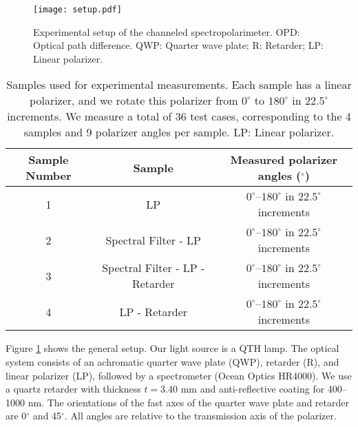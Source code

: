 \documentclass[10pt]{article}
\numberwithin{equation}{subsection}
\begin{document}
\begin{figure}[!htb]
    \centering
    \texttt{[image: setup.pdf]}
    \caption{Experimental setup of the channeled spectropolarimeter. OPD: Optical path difference. QWP: Quarter wave plate; R: Retarder; LP: Linear polarizer.}
    \label{fig:setup}
\end{figure}%

\begin{center}
    \begin{table}[!htb]
        \begin{tabular}{ccc}
    \toprule
    Sample Number & Sample & Measured polarizer angles ($^\circ$) \\
    \midrule
    1 & LP & $0^\circ$--$180^\circ$ in $22.5^\circ$ increments\\
    \midrule
    2 & Spectral Filter - LP & $0^\circ$--$180^\circ$ in $22.5^\circ$ increments\\
    \midrule
    3 & Spectral Filter - LP - Retarder & $0^\circ$--$180^\circ$ in $22.5^\circ$ increments \\
    \midrule
    4 & LP - Retarder & $0^\circ$--$180^\circ$ in $22.5^\circ$ increments \\
    \bottomrule
        \end{tabular}
        \caption{Samples used for experimental measurements. Each sample has a linear polarizer, and we rotate this polarizer from $0^\circ$ to $180^\circ$ in $22.5^\circ$ increments. We measure a total of 36 test cases, corresponding to the 4 samples and 9 polarizer angles per sample. LP: Linear polarizer.}
    \label{SampleTable}
    \end{table}
\end{center}
%

Figure \ref{fig:setup} shows the general setup.
Our light source is a QTH lamp.
The optical system consists of an achromatic quarter wave plate (QWP), retarder (R), and linear polarizer (LP), followed by a spectrometer (Ocean Optics HR4000).
We use a quartz retarder with thickness $t = 3.40$ mm and anti-reflective coating for 400--1000 nm.
The orientations of the fast axes of the quarter wave plate and retarder are 0$^\circ$ and 45$^\circ$.
All angles are relative to the transmission axis of the polarizer.
\end{document}
